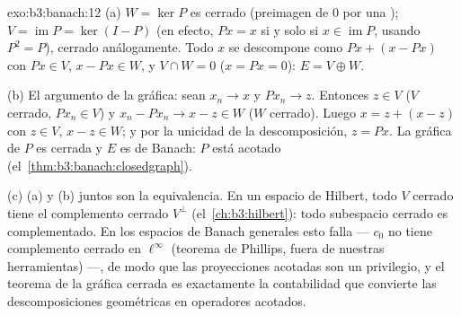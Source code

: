 \begin{solution}{exo:b3:banach:12}
(a) $W = \ker P$ es cerrado (preimagen de $0$ por una
);
$V = \operatorname{im}P = \ker(I - P)$ (en efecto, $Px = x$ si y solo si
$x \in \operatorname{im}P$, usando $P^2 =
P$), cerrado análogamente. Todo $x$ se descompone como $Px + (x - Px)$
con $Px \in V$, $x - Px \in W$, y $V \cap W = 0$ ($x = Px
= 0$): $E = V \oplus W$.

(b) El argumento de la gráfica: sean $x_n \to x$ y $Px_n \to z$.
Entonces $z \in V$ ($V$ cerrado, $Px_n \in V$) y $x_n - Px_n \to
x - z \in W$ ($W$ cerrado). Luego $x = z + (x - z)$ con $z \in
V$, $x - z \in W$; y por la unicidad de la descomposición, $z =
Px$. La gráfica de $P$ es cerrada y $E$ es de Banach: $P$ está acotado
(el~\cref{thm:b3:banach:closedgraph}).

(c) (a) y (b) juntos son la equivalencia. En un espacio de Hilbert, todo
$V$ cerrado tiene el complemento cerrado $V^\perp$
(el~\cref{ch:b3:hilbert}): todo subespacio cerrado es complementado. En
los espacios de Banach generales esto falla --- $c_0$ no tiene
complemento cerrado en $\ell^\infty$ (teorema de Phillips, fuera de
nuestras herramientas) ---, de modo que las proyecciones acotadas son un
privilegio, y el teorema de la gráfica cerrada es exactamente la
contabilidad que convierte las descomposiciones geométricas en
operadores acotados.
\end{solution}

